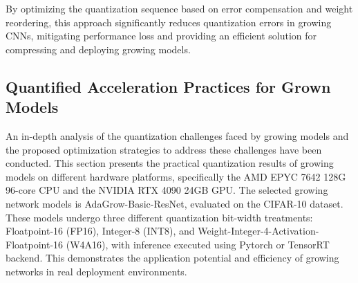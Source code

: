 \documentclass[preprint,12pt]{elsarticle}
\begin{document}
By optimizing the quantization sequence based on error compensation and weight reordering, this approach significantly reduces quantization errors in growing CNNs, mitigating performance loss and providing an efficient solution for compressing and deploying growing models.


\subsection{Quantified Acceleration Practices for Grown Models}

An in-depth analysis of the quantization challenges faced by growing models and the proposed optimization strategies to address these challenges have been conducted. This section presents the practical quantization results of growing models on different hardware platforms, specifically the AMD EPYC 7642 128G 96-core CPU and the NVIDIA RTX 4090 24GB GPU. The selected growing network models is AdaGrow-Basic-ResNet, evaluated on the CIFAR-10 dataset. These models undergo three different quantization bit-width treatments: Floatpoint-16 (FP16), Integer-8 (INT8), and Weight-Integer-4-Activation-Floatpoint-16 (W4A16), with inference executed using Pytorch or TensorRT \cite{trt} backend. This demonstrates the application potential and efficiency of growing networks in real deployment environments.
\end{document}
